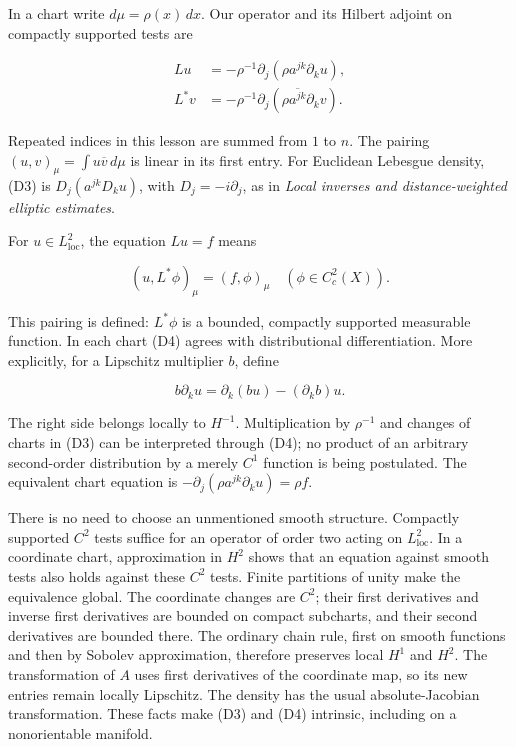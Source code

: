\documentclass[
  11pt,
]{article}
\begin{document}
In a chart write \(d\mu=\rho(x)\,dx\). Our operator and its Hilbert
adjoint on compactly supported tests are

\[
 \begin{split}
 Lu&=-\rho^{-1}\partial_j(\rho a^{jk}\partial_k u),\\
 L^*v&=-\rho^{-1}\partial_j(\rho\overline{a^{jk}}\partial_k v).
 \end{split}                                                     \tag{D3}
\]

Repeated indices in this lesson are summed from \(1\) to \(n\). The
pairing \((u,v)_\mu=\int u\overline v\,d\mu\) is linear in its first
entry. For Euclidean Lebesgue density, (D3) is \(D_j(a^{jk}D_k u)\),
with \(D_j=-i\partial_j\), as in \emph{Local inverses and
distance-weighted elliptic estimates}.

For \(u\in L^2_{\mathrm{loc}}\), the equation \(Lu=f\) means

\[
                  (u,L^*\phi)_\mu=(f,\phi)_\mu
                    \quad(\phi\in C_c^2(X)).                     \tag{D4}
\]

This pairing is defined: \(L^*\phi\) is a bounded, compactly supported
measurable function. In each chart (D4) agrees with distributional
differentiation. More explicitly, for a Lipschitz multiplier \(b\),
define

\[
                  b\partial_k u=\partial_k(bu)- (\partial_k b)u.
                                                                    \tag{D5}
\]

The right side belongs locally to \(H^{-1}\). Multiplication by
\(\rho^{-1}\) and changes of charts in (D3) can be interpreted through
(D4); no product of an arbitrary second-order distribution by a merely
\(C^1\) function is being postulated. The equivalent chart equation is
\(-\partial_j(\rho a^{jk}\partial_k u)=\rho f\).

There is no need to choose an unmentioned smooth structure. Compactly
supported \(C^2\) tests suffice for an operator of order two acting on
\(L^2_{\mathrm{loc}}\). In a coordinate chart, approximation in \(H^2\)
shows that an equation against smooth tests also holds against these
\(C^2\) tests. Finite partitions of unity make the equivalence global.
The coordinate changes are \(C^2\); their first derivatives and inverse
first derivatives are bounded on compact subcharts, and their second
derivatives are bounded there. The ordinary chain rule, first on smooth
functions and then by Sobolev approximation, therefore preserves local
\(H^1\) and \(H^2\). The transformation of \(A\) uses first derivatives
of the coordinate map, so its new entries remain locally Lipschitz. The
density has the usual absolute-Jacobian transformation. These facts make
(D3) and (D4) intrinsic, including on a nonorientable manifold.
\end{document}
